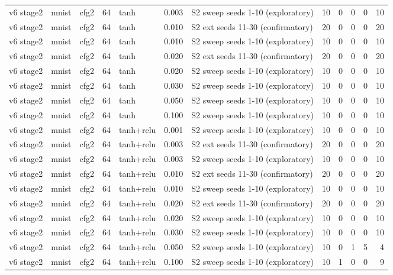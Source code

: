 \begin{table}[htbp]
{\begin{tabular}{@{}lllrlrlrrrrr@{}}
v6 stage2 & mnist & cfg2 & 64 & tanh & 0.003 & S2 sweep seeds 1-10 (exploratory) & 10 & 0 & 0 & 0 & 10 \\
v6 stage2 & mnist & cfg2 & 64 & tanh & 0.010 & S2 ext seeds 11-30 (confirmatory) & 20 & 0 & 0 & 0 & 20 \\
v6 stage2 & mnist & cfg2 & 64 & tanh & 0.010 & S2 sweep seeds 1-10 (exploratory) & 10 & 0 & 0 & 0 & 10 \\
v6 stage2 & mnist & cfg2 & 64 & tanh & 0.020 & S2 ext seeds 11-30 (confirmatory) & 20 & 0 & 0 & 0 & 20 \\
v6 stage2 & mnist & cfg2 & 64 & tanh & 0.020 & S2 sweep seeds 1-10 (exploratory) & 10 & 0 & 0 & 0 & 10 \\
v6 stage2 & mnist & cfg2 & 64 & tanh & 0.030 & S2 sweep seeds 1-10 (exploratory) & 10 & 0 & 0 & 0 & 10 \\
v6 stage2 & mnist & cfg2 & 64 & tanh & 0.050 & S2 sweep seeds 1-10 (exploratory) & 10 & 0 & 0 & 0 & 10 \\
v6 stage2 & mnist & cfg2 & 64 & tanh & 0.100 & S2 sweep seeds 1-10 (exploratory) & 10 & 0 & 0 & 0 & 10 \\
v6 stage2 & mnist & cfg2 & 64 & tanh+relu & 0.001 & S2 sweep seeds 1-10 (exploratory) & 10 & 0 & 0 & 0 & 10 \\
v6 stage2 & mnist & cfg2 & 64 & tanh+relu & 0.003 & S2 ext seeds 11-30 (confirmatory) & 20 & 0 & 0 & 0 & 20 \\
v6 stage2 & mnist & cfg2 & 64 & tanh+relu & 0.003 & S2 sweep seeds 1-10 (exploratory) & 10 & 0 & 0 & 0 & 10 \\
v6 stage2 & mnist & cfg2 & 64 & tanh+relu & 0.010 & S2 ext seeds 11-30 (confirmatory) & 20 & 0 & 0 & 0 & 20 \\
v6 stage2 & mnist & cfg2 & 64 & tanh+relu & 0.010 & S2 sweep seeds 1-10 (exploratory) & 10 & 0 & 0 & 0 & 10 \\
v6 stage2 & mnist & cfg2 & 64 & tanh+relu & 0.020 & S2 ext seeds 11-30 (confirmatory) & 20 & 0 & 0 & 0 & 20 \\
v6 stage2 & mnist & cfg2 & 64 & tanh+relu & 0.020 & S2 sweep seeds 1-10 (exploratory) & 10 & 0 & 0 & 0 & 10 \\
v6 stage2 & mnist & cfg2 & 64 & tanh+relu & 0.030 & S2 sweep seeds 1-10 (exploratory) & 10 & 0 & 0 & 0 & 10 \\
v6 stage2 & mnist & cfg2 & 64 & tanh+relu & 0.050 & S2 sweep seeds 1-10 (exploratory) & 10 & 0 & 1 & 5 & 4 \\
v6 stage2 & mnist & cfg2 & 64 & tanh+relu & 0.100 & S2 sweep seeds 1-10 (exploratory) & 10 & 1 & 0 & 0 & 9 \\

\end{tabular}}
\end{table}
